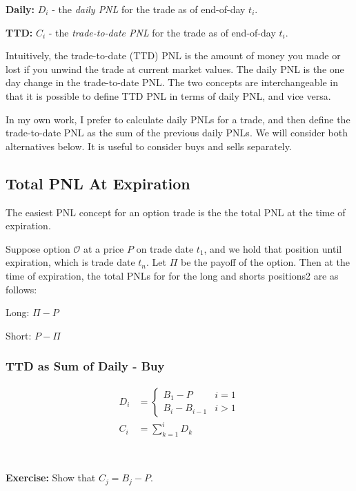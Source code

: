 \documentclass[11pt,]{krantz}
\begin{document}
\textbf{Daily:} \(D_{i}\) - the \emph{daily PNL} for the trade as of end-of-day \(t_i\).

\textbf{TTD:} \(C_{i}\) - the \emph{trade-to-date PNL} for the trade as of end-of-day \(t_i\).

Intuitively, the trade-to-date (TTD) PNL is the amount of money you made or lost if you unwind the trade at current market values. The daily PNL is the one day change in the trade-to-date PNL. The two concepts are interchangeable in that it is possible to define TTD PNL in terms of daily PNL, and vice versa.

In my own work, I prefer to calculate daily PNLs for a trade, and then define the trade-to-date PNL as the sum of the previous daily PNLs. We will consider both alternatives below. It is useful to consider buys and sells separately.

\subsection{Total PNL At Expiration}\label{total-pnl-at-expiration}

The easiest PNL concept for an option trade is the the total PNL at the time of expiration.

Suppose option \(\mathcal{O}\) at a price \(P\) on trade date \(t_{1}\), and we hold that position until expiration, which is trade date \(t_{n}\). Let \(\Pi\) be the payoff of the option. Then at the time of expiration, the total PNLs for for the long and shorts positions2 are as follows:

Long: \(\Pi - P\)

Short: \(P - \Pi\)

\subsubsection*{TTD as Sum of Daily - Buy}\label{ttd-as-sum-of-daily---buy}

\begin{align*}
D_{i} &= \begin{cases} B_{1} - P & i = 1 \\ B_{i} - B_{i-1} & i > 1 \end{cases} \\[10pt]
C_{i} &= \sum_{k=1}^{i} D_{k}
\end{align*}

~

\textbf{Exercise:} Show that \(C_{j} = B_{j} - P\).
\end{document}
